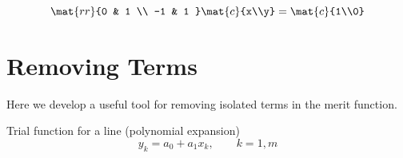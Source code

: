   \begin{equation*}   %
      \mat{rr}{0 & 1 \\ -1 & 1 }\mat{c}{x\\y} = \mat{c}{1\\0}
  \end{equation*}


\section{Removing Terms}  %
Here we develop a useful tool for removing isolated terms in the merit function.

Trial function for a line (polynomial expansion)
  \begin{equation*}   %
      y_{k} = a_{0} + a_{1} x_{k}, \qquad k = 1, m
  \end{equation*}

